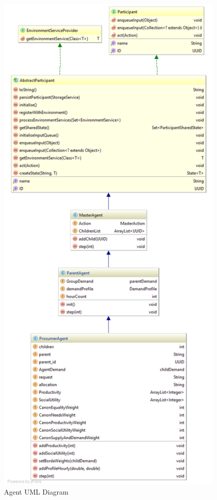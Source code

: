 \begin{figure}[!h]
	\centering
	\includegraphics[scale=0.4]{Images/AgentUMLEdited.png}
	\caption{Agent UML Diagram}
	\label{fig:AgentUML}
\end{figure}


